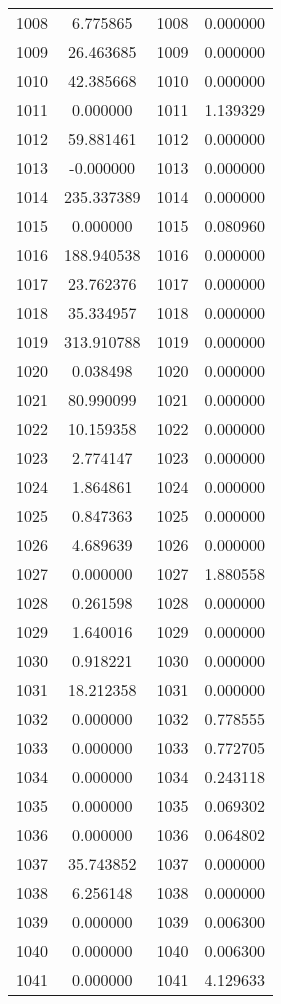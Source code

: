\documentclass[12pt]{article}
\begin{document}
\begin{longtable}{@{}cccc@{}}
1008 & 6.775865 & 1008 & 0.000000 \\
1009 & 26.463685 & 1009 & 0.000000 \\
1010 & 42.385668 & 1010 & 0.000000 \\
1011 & 0.000000 & 1011 & 1.139329 \\
1012 & 59.881461 & 1012 & 0.000000 \\
1013 & -0.000000 & 1013 & 0.000000 \\
1014 & 235.337389 & 1014 & 0.000000 \\
1015 & 0.000000 & 1015 & 0.080960 \\
1016 & 188.940538 & 1016 & 0.000000 \\
1017 & 23.762376 & 1017 & 0.000000 \\
1018 & 35.334957 & 1018 & 0.000000 \\
1019 & 313.910788 & 1019 & 0.000000 \\
1020 & 0.038498 & 1020 & 0.000000 \\
1021 & 80.990099 & 1021 & 0.000000 \\
1022 & 10.159358 & 1022 & 0.000000 \\
1023 & 2.774147 & 1023 & 0.000000 \\
1024 & 1.864861 & 1024 & 0.000000 \\
1025 & 0.847363 & 1025 & 0.000000 \\
1026 & 4.689639 & 1026 & 0.000000 \\
1027 & 0.000000 & 1027 & 1.880558 \\
1028 & 0.261598 & 1028 & 0.000000 \\
1029 & 1.640016 & 1029 & 0.000000 \\
1030 & 0.918221 & 1030 & 0.000000 \\
1031 & 18.212358 & 1031 & 0.000000 \\
1032 & 0.000000 & 1032 & 0.778555 \\
1033 & 0.000000 & 1033 & 0.772705 \\
1034 & 0.000000 & 1034 & 0.243118 \\
1035 & 0.000000 & 1035 & 0.069302 \\
1036 & 0.000000 & 1036 & 0.064802 \\
1037 & 35.743852 & 1037 & 0.000000 \\
1038 & 6.256148 & 1038 & 0.000000 \\
1039 & 0.000000 & 1039 & 0.006300 \\
1040 & 0.000000 & 1040 & 0.006300 \\
1041 & 0.000000 & 1041 & 4.129633 \\

\end{longtable}
\end{document}

